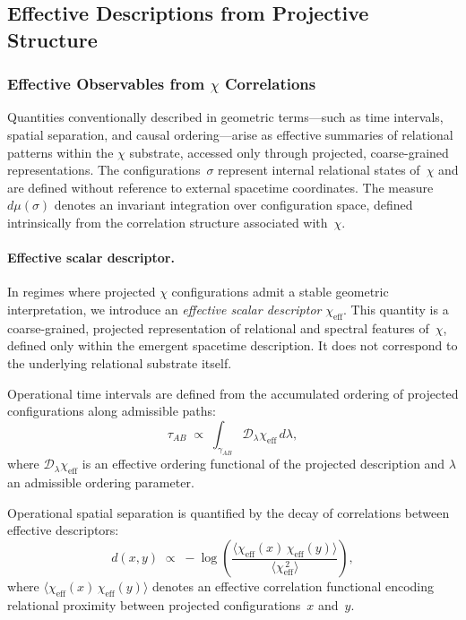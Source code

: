 \subsection{Effective Descriptions from Projective Structure}
  \label{subsec:geometric-action}

  \subsubsection*{Effective Observables from
  \texorpdfstring{$\chi$}{χ} Correlations}

    Quantities conventionally described in geometric terms---such as time
    intervals, spatial separation, and causal ordering---arise as effective
    summaries of relational patterns within the $\chi$ substrate, accessed only
    through projected, coarse-grained representations.
    The configurations~$\sigma$ represent internal relational states of~$\chi$
    and are defined without reference to external spacetime coordinates.
    The measure~$d\mu(\sigma)$ denotes an invariant integration over
    configuration space, defined intrinsically from the correlation structure
    associated with~$\chi$.

    \paragraph{Effective scalar descriptor.}
      In regimes where projected $\chi$ configurations admit a stable geometric
      interpretation, we introduce an \emph{effective scalar descriptor}
      $\chi_{\mathrm{eff}}$.
      This quantity is a coarse-grained, projected representation of relational
      and spectral features of~$\chi$, defined only within the emergent spacetime
      description.
      It does not correspond to the underlying relational substrate itself.

      Operational time intervals are defined from the accumulated ordering of
      projected configurations along admissible paths:
    \begin{equation}
      \tau_{AB} \;\propto\;
      \int_{\gamma_{AB}}
      \mathcal{D}_{\lambda} \chi_{\mathrm{eff}} \, d\lambda ,
      \end{equation}
      where $\mathcal{D}_{\lambda} \chi_{\mathrm{eff}}$ is an effective
      ordering functional of the projected description and $\lambda$ an
      admissible ordering parameter.

      Operational spatial separation is quantified by the decay of correlations
      between effective descriptors:
    \begin{equation}
      d(x,y) \;\propto\;
      - \log\!\left(
                \frac{\langle \chi_{\mathrm{eff}}(x)\,
                \chi_{\mathrm{eff}}(y)\rangle}
                {\langle \chi_{\mathrm{eff}}^{\,2}\rangle}
      \right),
      \end{equation}
      where $\langle\chi_{\text{eff}}(x)\,\chi_{\text{eff}}(y)\rangle$ denotes
      an effective correlation functional encoding relational proximity between
      projected configurations~$x$ and~$y$.


